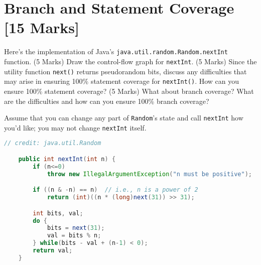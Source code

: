 \documentclass[12pt]{article}
\begin{document}









\section{Branch and Statement Coverage [15 Marks]}

Here's the implementation of Java's \texttt{java.util.random.Random.nextInt} function. (5 Marks) Draw the control-flow graph
for \texttt{nextInt}. (5 Marks) Since the utility function \texttt{next()} returns pseudorandom bits,
discuss any difficulties that may arise in ensuring 100\% statement coverage for \texttt{nextInt()}.
How can you ensure 100\% statement coverage? 
(5 Marks) What about branch coverage? What are the difficulties and how can you ensure 100\% branch coverage?

\vspace*{1em}

Assume that you can change any part of {\tt Random}'s state and call \texttt{nextInt} how you'd like; you may not change \texttt{nextInt} itself.
\begin{lstlisting}[language=Java]
    // credit: java.util.Random

    public int nextInt(int n) {
        if (n<=0)
            throw new IllegalArgumentException("n must be positive");

        if ((n & -n) == n)  // i.e., n is a power of 2
            return (int)((n * (long)next(31)) >> 31);

        int bits, val;
        do {
            bits = next(31);
            val = bits % n;
        } while(bits - val + (n-1) < 0);
        return val;
    }
\end{lstlisting}
\end{document}
